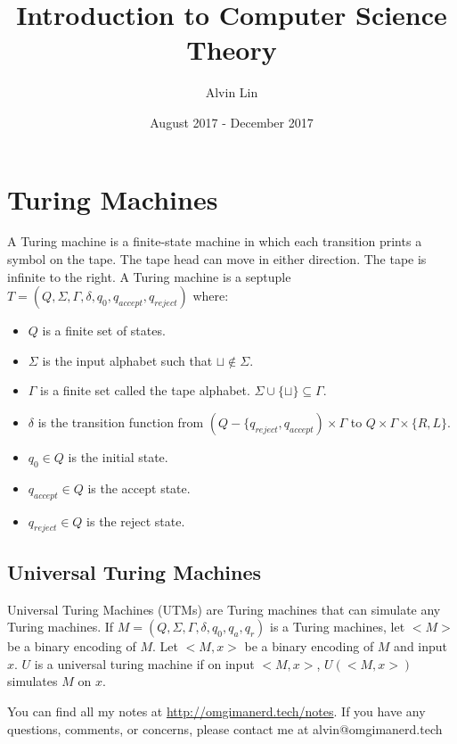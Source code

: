 \documentclass{math}
\title{Introduction to Computer Science Theory}
\author{Alvin Lin}
\date{August 2017 - December 2017}
\begin{document}
\maketitle

\section*{Turing Machines}
A Turing machine is a finite-state machine in which each transition prints a
symbol on the tape. The tape head can move in either direction. The tape is
infinite to the right. A Turing machine is a septuple \( T =
(Q,\Sigma,\Gamma,\delta,q_0,q_{accept},q_{reject}) \) where:
\begin{itemize}
  \item \( Q \) is a finite set of states.
  \item \( \Sigma \) is the input alphabet such that \( \sqcup\notin\Sigma \).
  \item \( \Gamma \) is a finite set called the tape alphabet.
  \( \Sigma\cup\{\sqcup\}\subseteq\Gamma \).
  \item \( \delta \) is the transition function from
    \( (Q-\{q_{reject},q_{accept})\times\Gamma \) to
    \( Q\times\Gamma\times\{R,L\} \).
  \item \( q_0\in Q \) is the initial state.
  \item \( q_{accept}\in Q \) is the accept state.
  \item \( q_{reject}\in Q \) is the reject state.
\end{itemize}

\subsection*{Universal Turing Machines}
Universal Turing Machines (UTMs) are Turing machines that can simulate any
Turing machines. If \( M = (Q,\Sigma,\Gamma,\delta,q_0,q_a,q_r) \) is a
Turing machines, let \( <M> \) be a binary encoding of \( M \). Let \( <M,x> \)
be a binary encoding of \( M \) and input \( x \). \( U \) is a universal turing
machine if on input \( <M,x> \), \( U(<M,x>) \) simulates \( M \) on \( x \).

\begin{center}
  You can find all my notes at \url{http://omgimanerd.tech/notes}. If you have
  any questions, comments, or concerns, please contact me at
  alvin@omgimanerd.tech
\end{center}
\end{document}
